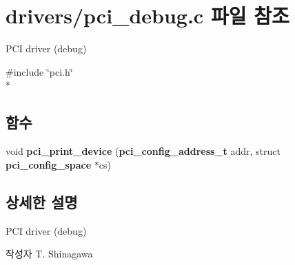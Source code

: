 \section{drivers/pci\-\_\-debug.c 파일 참조}
\label{pci__debug_8c}


P\-C\-I driver (debug)  


{\ttfamily \#include \char`\"{}pci.\-h\char`\"{}}\\*
\subsection*{함수}
\begin{DoxyCompactItemize}
\item 
void {\bfseries pci\-\_\-print\-\_\-device} ({\bf pci\-\_\-config\-\_\-address\-\_\-t} addr, struct {\bf pci\-\_\-config\-\_\-space} $\ast$cs)\label{pci__debug_8c_a4a327333fb99caaf1cf43961218f3948}

\end{DoxyCompactItemize}


\subsection{상세한 설명}
P\-C\-I driver (debug) \begin{DoxyAuthor}{작성자}
T. Shinagawa 
\end{DoxyAuthor}
